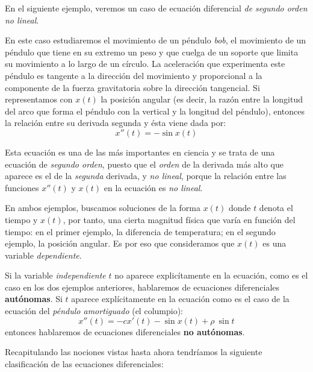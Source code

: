 En el siguiente ejemplo, veremos un caso de ecuación diferencial \emph{de segundo orden} \emph{no lineal}.

\begin{example}[Péndulo]
En este caso estudiaremos el movimiento de un péndulo \emph{bob}, el movimiento de un péndulo que tiene en su extremo un peso y que cuelga de un soporte que limita su movimiento a lo largo de un círculo. La aceleración que experimenta este péndulo es tangente a la dirección del movimiento y proporcional a la componente de la fuerza gravitatoria sobre la dirección tangencial. Si representamos con $x(t)$ la posición angular (es decir, la razón entre la longitud del arco que forma el péndulo con la vertical y la longitud del péndulo), entonces la relación entre su derivada segunda y ésta viene dada por:
\begin{equation}
x''(t) = -\sin x(t)
\end{equation}

Esta ecuación es una de las más importantes en ciencia y se trata de una ecuación de \emph{segundo orden}, puesto que el \emph{orden} de la derivada más alto que aparece es el de la \emph{segunda} derivada, y \emph \emph{no lineal}, porque la relación entre las funciones $x''(t)$ y $x(t)$ en la ecuación es \emph{no lineal}.
\end{example}


En ambos ejemplos, buscamos soluciones de la forma $x(t)$ donde $t$ denota el tiempo y $x(t)$, por tanto, una cierta magnitud física que varía en función del tiempo: en el primer ejemplo, la diferencia de temperatura; en el segundo ejemplo, la posición angular. Es por eso que consideramos que $x(t)$ es una variable \emph{dependiente}.


\begin{definition}
Si la variable \emph{independiente} $t$ no aparece explicítamente en la ecuación, como es el caso en los dos ejemplos anteriores, hablaremos de ecuaciones diferenciales \textbf{autónomas}. Si $t$ aparece explícitamente en la ecuación como es el caso de la ecuación del \emph{péndulo amortiguado} (el columpio):
\begin{equation}
x''(t) = -cx'(t)-\sin x(t)+\rho~\sin t
\end{equation}
entonces hablaremos de ecuaciones diferenciales \textbf{no autónomas}.
\end{definition}

Recapitulando las nociones vistas hasta ahora tendríamos la siguiente clasificación de las ecuaciones diferenciales:

